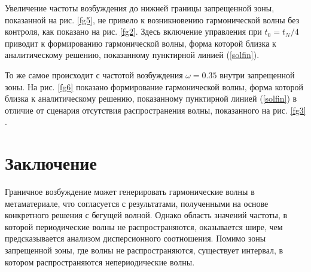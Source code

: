 Увеличение частоты возбуждения до нижней границы запрещенной зоны, показанной на рис. \ref{fg5}, не привело к возникновению гармонической волны без контроля, как показано на рис. \ref{fg2}. Здесь включение управления при $ t_0 = t_N / 4 $ приводит к формированию гармонической волны, форма которой близка к аналитическому решению, показанному пунктирной линией (\ref {solfin}).

То же самое происходит с частотой возбуждения $\omega = 0.35 $ внутри запрещенной зоны. На рис. \ref {fg6} показано формирование гармонической волны, форма которой близка к аналитическому решению, показанному пунктирной линией (\ref {solfin}) в отличие от сценария отсутствия распространения волны, показанного на рис. \ref {fg3} .


\section{Заключение}

Граничное возбуждение может генерировать гармонические волны в метаматериале, что согласуется с результатами, полученными на основе конкретного решения с бегущей волной. Однако область значений частоты, в которой периодические волны не распространяются, оказывается шире, чем предсказывается анализом дисперсионного соотношения. Помимо зоны запрещенной зоны, где волны не распространяются, существует интервал, в котором распространяются непериодические волны.

